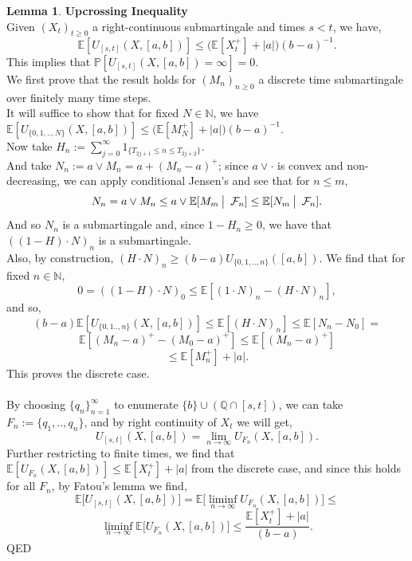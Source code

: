 \documentclass[12pt]{article}
\newcommand{\cF}{\mathcal{F}}
\newcommand{\E}{\mathbb{E}}
\newcommand{\N}{\mathbb{N}}
\newcommand{\Q}{\mathbb{Q}}
\newcommand{\Prb}{\mathbb{P}}
\newcommand{\quantifyspace}{\hspace{2px} \big | \hspace{5px}}
\newcommand{\ind}[1]{1_{\{#1\}}}
\newcommand{\QED}{\hspace*{\fill}\textup{QED}}
\theoremstyle{definition}
\newtheorem{lemma}{Lemma}
\begin{document}
\begin{lemma} \textbf{Upcrossing Inequality} \\
    Given $(X_t)_{t \geq 0}$ a right-continuous submartingale and times $s < t$, we have,
    \[
        \E[U_{[s,t]}(X, [a,b])] \leq \Big ( \E[X_t^+] + |a| \Big ) (b - a)^{-1}.
    \]
    This implies that $\Prb [U_{[s,t]}(X, [a,b]) = \infty] = 0$. \\

    \proof
        We first prove that the result holds for $(M_n)_{n \geq 0}$ a discrete time submartingale over finitely many time steps.  \\
        It will suffice to show that for fixed $N \in \N$, we have $\E [U_{\{0,1,..,N\}}(X, [a,b])] \leq \Big ( \E[M_N^+] + |a| \Big ) (b - a)^{-1}$. \\
        Now take $H_n := \sum_{j=0}^\infty \ind{T_{2j + 1} \leq n \leq T_{2j + 2}}$. \\
        And take $N_n := a \vee M_n = a + (M_n - a)^+$; since $a \vee \cdot$ is convex and non-decreasing, we can apply conditional Jensen's and see that for $n \leq m$,
        \[
            N_n = a \vee M_n \leq a \vee \E[M_m \quantifyspace \cF_n] \leq \E[N_m \quantifyspace \cF_n].
        \]
        And so $N_n$ is a submartingale and, since $1 - H_n \geq 0$, we have that $((1 - H) \cdot N)_n$ is a submartingale. \\
        Also, by construction, $(H \cdot N)_n \geq (b - a) U_{\{0, 1, .., n\}}([a,b])$.
        We find that for fixed $n \in \N$,
        \[
            0 = ((1 - H) \cdot N)_0 \leq \E[(1 \cdot N)_n - (H \cdot N)_n],
        \]
        and so,
        \[
            (b - a) \E[U_{\{0,1..,n\}}(X, [a,b])] \leq \E[(H \cdot N)_n] \leq \E[N_n - N_0] =
        \]
        \[
            \E[(M_n - a)^+ - (M_0 - a)^+]
            \leq \E[(M_n - a)^+]
        \]
        \[
            \leq \E[M_n^+] + |a|.
        \]
        This proves the discrete case. \\
        \\
        By choosing $\{q_n\}_{n = 1}^\infty$ to enumerate $\{b\} \cup (\Q \cap [s, t])$, we can take $F_n := \{q_1, .., q_n\}$, and by right continuity of $X_t$ we will get,
        \[
            U_{[s,t]}(X, [a,b]) = \lim_{n \to \infty} U_{F_n}(X, [a,b]).
        \]
        Further restricting to finite times, we find that $\E[U_{F_n}(X, [a,b])] \leq \E[X_t^+] + |a|$ from the discrete case, and since this holds for all $F_n$, by Fatou's lemma we find,
        \[
            \E \big [U_{[s,t]}(X, [a,b]) \big ] = \E \Big [ \liminf_{n \to \infty } U_{F_n}(X, [a,b]) \Big ] \leq
        \]
        \[
            \liminf_{n \to \infty} \E \big [ U_{F_n}(X, [a,b]) \big ] \leq \frac{\E[X_t^+] + |a|}{(b-a)}.
        \]
        \QED

\end{lemma}
\end{document}
